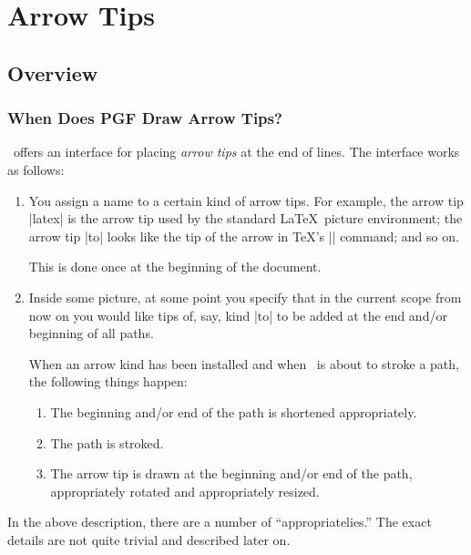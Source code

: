 %


\section{Arrow Tips}
\label{section-arrows}


\subsection{Overview}

\subsubsection{When Does PGF Draw Arrow Tips?}

\pgfname\ offers an interface for placing \emph{arrow tips} at the end
of lines. The interface works as follows:

\begin{enumerate}
\item
  You assign a name to a certain kind of arrow tips. For example, the
  arrow tip |latex| is the arrow tip used by the standard \LaTeX\
  picture environment; the arrow tip |to| looks like the tip of the
  arrow in \TeX's |\to| command; and so on.

  This is done once at the beginning of the document.
\item
  Inside some picture, at some point you specify that in the current
  scope from now on you would like tips of, say, kind |to| to be added
  at the end and/or beginning of all paths.

  When an arrow kind has been installed and when \pgfname\ is about to
  stroke a path, the following things happen:
  \begin{enumerate}
  \item
    The beginning and/or end of the path is shortened appropriately.
  \item
    The path is stroked.
  \item
    The arrow tip is drawn at the beginning and/or end of the path,
    appropriately rotated and appropriately resized.
  \end{enumerate}
\end{enumerate}

In the above description, there are a number of ``appropriatelies.''
The exact details are not quite trivial and described later on.

